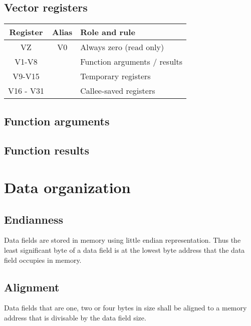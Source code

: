 
\subsection{Vector registers}

\begin{tabular}{|c|c|p{120pt}|}
  \hline
  \textbf{Register} & \textbf{Alias} & \textbf{Role and rule} \\
  \hline
  VZ & V0 & Always zero (read only) \\
  \hline
  V1-V8 & & Function arguments / results \\
  \hline
  V9-V15 & & Temporary registers \\
  \hline
  V16 - V31 & & Callee-saved registers \\
  \hline
\end{tabular}


\subsection{Function arguments}

\tbd

\subsection{Function results}

\tbd

\section{Data organization}

\subsection{Endianness}

Data fields are stored in memory using little endian representation. Thus the
least significant byte of a data field is at the lowest byte address that the
data field occupies in memory.

\subsection{Alignment}

Data fields that are one, two or four bytes in size shall be aligned to a
memory address that is divisable by the data field size.

